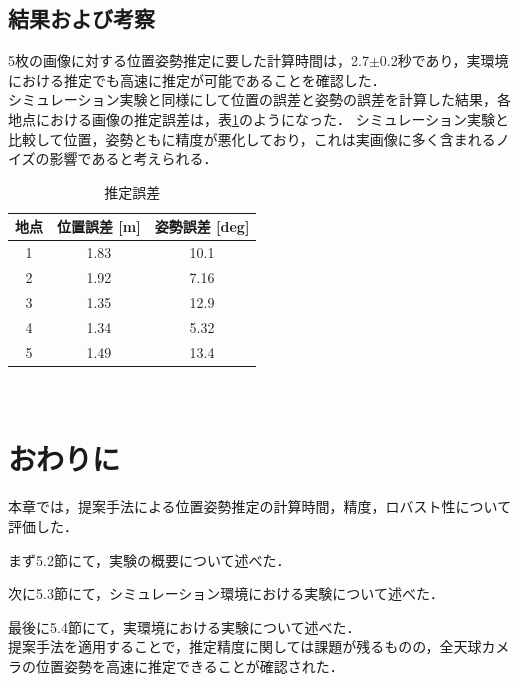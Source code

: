 \clearpage
\subsection{結果および考察}

5枚の画像に対する位置姿勢推定に要した計算時間は，2.7$\pm$0.2秒であり，実環境における推定でも高速に推定が可能であることを確認した．
\\

シミュレーション実験と同様にして位置の誤差と姿勢の誤差を計算した結果，各地点における画像の推定誤差は，表\ref{tab:result2}のようになった．
シミュレーション実験と比較して位置，姿勢ともに精度が悪化しており，これは実画像に多く含まれるノイズの影響であると考えられる．

\begin{table}[htb]
 \begin{center}
 \caption{推定誤差}
  \begin{tabular}{c||c|c} \hline
    地点 & 位置誤差 [m] & 姿勢誤差 [deg]  \\ \hline \hline
     1 & 1.83  & 10.1  \\ 
     2 & 1.92 & 7.16  \\ 
     3 & 1.35 & 12.9  \\
     4 & 1.34 & 5.32  \\
     5 & 1.49 & 13.4  \\ \hline
  \end{tabular}
　\label{tab:result2}
 \end{center}
\end{table}


\clearpage
\section{おわりに}
本章では，提案手法による位置姿勢推定の計算時間，精度，ロバスト性について評価した．

まず5.2節にて，実験の概要について述べた．

次に5.3節にて，シミュレーション環境における実験について述べた．

最後に5.4節にて，実環境における実験について述べた．
\\

提案手法を適用することで，推定精度に関しては課題が残るものの，全天球カメラの位置姿勢を高速に推定できることが確認された．

\newpage
